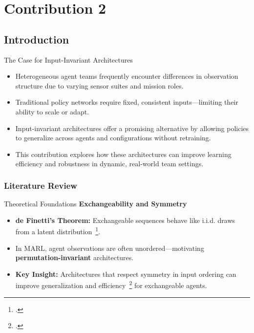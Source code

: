 \section{Contribution 2}


\subsection{Introduction}

\begin{frame}{The Case for Input-Invariant Architectures}
    \begin{itemize}
        \item Heterogeneous agent teams frequently encounter differences in observation 
            structure due to varying sensor suites and mission roles.
        \item Traditional policy networks require fixed, consistent inputs—limiting their 
            ability to scale or adapt.
        \item Input-invariant architectures offer a promising alternative by allowing 
            policies to generalize across agents and configurations without retraining.
        \item This contribution explores how these architectures can improve learning 
            efficiency and robustness in dynamic, real-world team settings.
    \end{itemize}
\end{frame}


\subsubsection{Literature Review}


\begin{frame}{Theoretical Foundations}
    \textbf{Exchangeability and Symmetry}
    \begin{itemize}
        \item \textbf{de Finetti's Theorem:} Exchangeable sequences behave like i.i.d. 
            draws from a latent distribution~\footcite{alvarez-melis2015}.
        \item In MARL, agent observations are often unordered—motivating 
            \textbf{permutation-invariant} architectures.
        \item \textbf{Key Insight:} Architectures that respect symmetry in input 
            ordering can improve generalization and efficiency~\footcite{hartford2018}
            for exchangeable agents.
    \end{itemize}
\end{frame}

